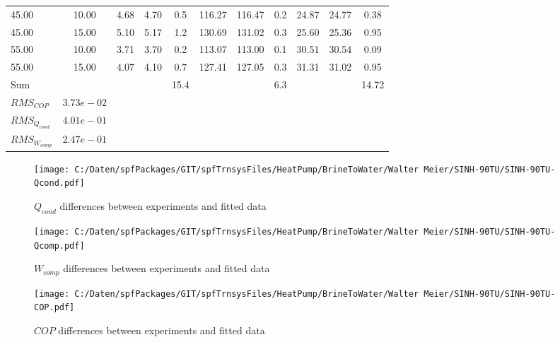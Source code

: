 \documentclass[english]{SPFShortReport}
\begin{document}
\begin{table}[!ht]
\begin{small}
\begin{center}
{\begin{tabular}{l | c c c c c c c c c c }
45.00  & 10.00 & 4.68 & 4.70 & 0.5 & 116.27 & 116.47 & 0.2 & 24.87 & 24.77 & 0.38\\ 
45.00  & 15.00 & 5.10 & 5.17 & 1.2 & 130.69 & 131.02 & 0.3 & 25.60 & 25.36 & 0.95\\ 
55.00  & 10.00 & 3.71 & 3.70 & 0.2 & 113.07 & 113.00 & 0.1 & 30.51 & 30.54 & 0.09\\ 
55.00  & 15.00 & 4.07 & 4.10 & 0.7 & 127.41 & 127.05 & 0.3 & 31.31 & 31.02 & 0.95\\ 
\hline 
 Sum &  & &  & 15.4 &  &  & 6.3 & &  & 14.72\\ 
\hline 
 $RMS_{COP}$ & $3.73e-02$ \\ 
 $RMS_{Q_{cond}}$ & $4.01e-01$ \\ 
 $RMS_{W_{comp}}$ & $2.47e-01$ \\ 
\hline
\hline
\end{tabular}
}
\label{ErrorsTable}
\end{center}
\end{small}
\end{table}
\begin{figure}[!ht]
\begin{center}
\texttt{[image: C:/Daten/spfPackages/GIT/spfTrnsysFiles/HeatPump/BrineToWater/Walter Meier/SINH-90TU/SINH-90TU-Qcond.pdf]}
\caption{$Q_{cond}$ differences between experiments and fitted data}
\label{QcongFig}
\end{center}
\end{figure}
\begin{figure}[!ht]
\begin{center}
\texttt{[image: C:/Daten/spfPackages/GIT/spfTrnsysFiles/HeatPump/BrineToWater/Walter Meier/SINH-90TU/SINH-90TU-Qcomp.pdf]}
\caption{$W_{comp}$ differences between experiments and fitted data}
\label{QcompFig}
\end{center}
\end{figure}
\begin{figure}[!ht]
\begin{center}
\texttt{[image: C:/Daten/spfPackages/GIT/spfTrnsysFiles/HeatPump/BrineToWater/Walter Meier/SINH-90TU/SINH-90TU-COP.pdf]}
\caption{$COP$ differences between experiments and fitted data}
\label{COPFig}
\end{center}
\end{figure}
\end{document}
